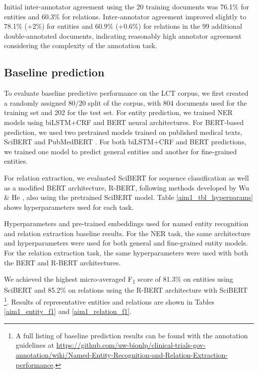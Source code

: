 \documentclass[../main.tex]{subfiles}
\begin{document}
Initial inter-annotator agreement using the 20 training documents was 76.1\% for entities and 60.3\% for relations. Inter-annotator agreement improved slightly to 78.1\% (+2\%) for entities and 60.9\% (+0.6\%) for relations in the 99 additional double-annotated documents, indicating reasonably high annotator agreement considering the complexity of the annotation task.

\subsection{Baseline prediction}
To evaluate baseline predictive performance on the LCT corpus, we first created a randomly assigned 80/20 split of the corpus, with 804 documents used for the training set and 202 for the test set. For entity prediction, we trained NER models using biLSTM+CRF and BERT \cite{devlin2018bert} neural architectures. For BERT-based prediction, we used two pretrained models trained on published medical texts, SciBERT \cite{beltagy2019scibert} and PubMedBERT \cite{gu2021domain}. For both biLSTM+CRF and BERT predictions, we trained one model to predict general entities and another for fine-grained entities. 

For relation extraction, we evaluated SciBERT for sequence classification as well as a modified BERT architecture, R-BERT, following methods developed by Wu \& He \cite{wu2019enriching}, also using the pretrained SciBERT model. Table \ref{aim1_tbl_hyperparams} shows hyperparameters used for each task.

\def\arraystretch{1.2}
\begin{table}[h!]
  \centering
  \def\arraystretch{1}
  \footnotesize
  
  \caption{Hyperparameters and pre-trained embeddings used for named entity recognition and relation extraction baseline results. For the NER task, the same architecture and hyperparameters were used for both general and fine-grained entity models. For the relation extraction task, the same hyperparameters were used with both the BERT and R-BERT architectures.}
  \label{aim1_tbl_hyperparams}
\end{table}

We achieved the highest micro-averaged F\textsubscript{1} score of 81.3\% on entities using SciBERT and 85.2\% on relations using the R-BERT architecture with SciBERT \footnote{A full listing of baseline prediction results can be found with the annotation guidelines at \url{https://github.com/uw-bionlp/clinical-trials-gov-annotation/wiki/Named-Entity-Recognition-and-Relation-Extraction-performance}. }. Results of representative entities and relations are shown in Tables \ref{aim1_entity_f1} and \ref{aim1_relation_f1}.
\end{document}
